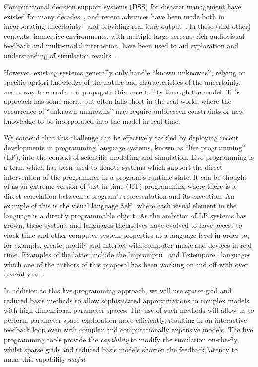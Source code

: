 \documentclass[a4paper,fontsize=12pt]{scrartcl}
\begin{document}
Computational decision support systems (DSS) for disaster management
have existed for many decades~\parencite{wallace_decision_1985}, and
recent advances have been made both in incorporating
uncertainty~\parencite{thompson_social_2014-1,neale_navigating_2015}
and providing real-time output~\parencite{yu_support_2006}. In these
(and other) contexts, immersive environments, with multiple large
screens, rich audiovisual feedback and multi-modal interaction, have
been used to aid exploration and understanding of simulation
results~\parencite{colella_participatory_2000,lui_supporting_2014}.

However, existing systems generally only handle ``known unknowns'',
relying on specific apriori knowledge of the nature and
characteristics of the uncertainty, and a way to encode and propagate
this uncertainty through the model. This approach has some merit, but
often falls short in the real world, where the occurrence of ``unknown
unknowns'' may require unforeseen constraints or new knowledge to be
incorporated into the model in real-time.

We contend that this challenge can be effectively tackled by deploying
recent developments in programming language systems, known as ``live
programming'' (LP), into the context of scientific modelling and
simulation. Live programming is a term which has been used to denote
systems which support the direct intervention of the programmer in a
program's runtime state. It can be thought of as an extreme version of
just-in-time (JIT) programming where there is a direct correlation
between a program's representation and its execution. An example of
this is the visual language Self~\parencite{ungar_self_1987} where
each visual element in the language is a directly programmable object.
As the ambition of LP systems has grown, these systems and languages
themselves have evolved to have access to clock-time and other
computer-system properties at a language level in order to, for
example, create, modify and interact with computer music and devices
in real time. Examples of the latter include the
Impromptu~\parencite{sorensen_impromptu_2005} and
Extempore~\parencite{sorensen_extempore} languages which one of the
authors of this proposal has been working on and off with over several
years.

In addition to this live programming approach, we will use sparse grid
and reduced basis 
methods to allow sophisticated approximations to complex models with
high-dimensional parameter spaces. The use of such methods will allow
us to perform parameter space exploration more efficiently, resulting
in an interactive feedback loop even with complex and computationally
expensive models. The live programming tools provide the
\emph{capability} to modify the simulation on-the-fly, whilst sparse grids
and reduced basis models shorten the feedback latency to make this 
capability \emph{useful}.
\end{document}
